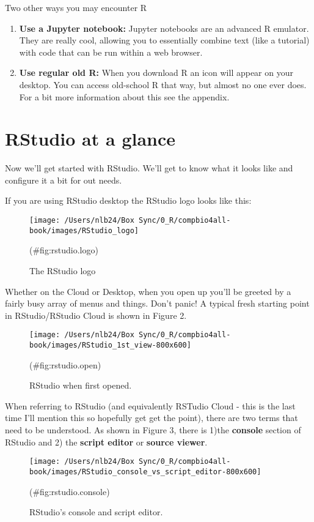 \documentclass[
]{book}
\providecommand{\tightlist}{%
  \setlength{\itemsep}{0pt}\setlength{\parskip}{0pt}}
\begin{document}
Two other ways you may encounter R

\begin{enumerate}
\def\labelenumi{\arabic{enumi}.}
\tightlist
\item
  \textbf{Use a Jupyter notebook:} Jupyter notebooks are an advanced R emulator. They are really cool, allowing you to essentially combine text (like a tutorial) with code that can be run within a web browser.\\
\item
  \textbf{Use regular old R:} When you download R an icon will appear on your desktop. You can access old-school R that way, but almost no one ever does. For a bit more information about this see the appendix.
\end{enumerate}

\hypertarget{rstudio-at-a-glance}{%
\section{RStudio at a glance}\label{rstudio-at-a-glance}}

Now we'll get started with RStudio. We'll get to know what it looks like and configure it a bit for out needs.

If you are using RStudio desktop the RStudio logo looks like this:

\begin{figure}
\texttt{[image: /Users/nlb24/Box Sync/0\_R/compbio4all-book/images/RStudio\_logo]} \caption{The RStudio logo}(\#fig:rstudio.logo)
\end{figure}

Whether on the Cloud or Desktop, when you open up you'll be greeted by a fairly busy array of menus and things. Don't panic! A typical fresh starting point in RStudio/RStudio Cloud is shown in Figure 2.

\begin{figure}
\texttt{[image: /Users/nlb24/Box Sync/0\_R/compbio4all-book/images/RStudio\_1st\_view-800x600]} \caption{RStudio when first opened.}(\#fig:rstudio.open)
\end{figure}

When referring to RStudio (and equivalently RSTudio Cloud - this is the last time I'll mention this so hopefully get get the point), there are two terms that need to be understood. As shown in Figure 3, there is 1)the \textbf{console} section of RStudio and 2) the \textbf{script editor} or \textbf{source viewer}.

\begin{figure}
\texttt{[image: /Users/nlb24/Box Sync/0\_R/compbio4all-book/images/RStudio\_console\_vs\_script\_editor-800x600]} \caption{RStudio's console and script editor.}(\#fig:rstudio.console)
\end{figure}
\end{document}
